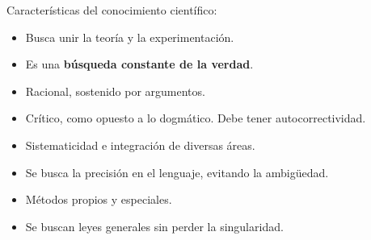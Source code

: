 \documentclass{article}
\begin{document}
Características del conocimiento científico:

\begin{itemize}
	\item Busca unir la teoría y la experimentación.
	\item Es una \textbf{búsqueda constante de la verdad}.
	\item Racional, sostenido por argumentos.
	\item Crítico, como opuesto a lo dogmático. Debe tener autocorrectividad.
	\item Sistematicidad e integración de diversas áreas.
	\item Se busca la precisión en el lenguaje, evitando la ambigüedad.
	\item Métodos propios y especiales.
	\item Se buscan leyes generales sin perder la singularidad.	
\end{itemize}
	
\end{document}

